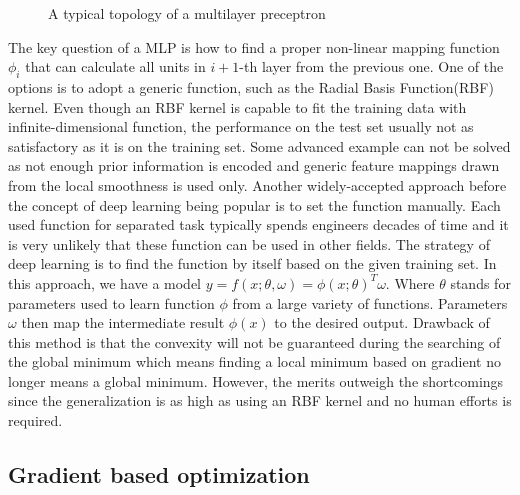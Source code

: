 \begin{figure}[!ht]
    \centering
    \caption{A typical topology of a multilayer preceptron}
    \label{lr_fig:ml_mlp_intro}
\end{figure}
%
The key question of a MLP is how to find a proper non-linear mapping function $\phi_i$ that can calculate all units in $i+1$-th layer from the previous one.
One of the options is to adopt a generic function, such as the Radial Basis Function(RBF)\citep{chang2010} kernel.
Even though an RBF kernel is capable to fit the training data with infinite-dimensional function, the performance on the test set usually not as satisfactory as it is on the training set.
Some advanced example can not be solved as not enough prior information is encoded and generic feature mappings drawn from the local smoothness is used only.
Another widely-accepted approach before the concept of deep learning being popular is to set the function manually.
Each used function for separated task typically spends engineers decades of time and it is very unlikely that these function can be used in other fields.
The strategy of deep learning is to find the function by itself based on the given training set.
In this approach, we have a model $y=f(x;\theta,\omega)=\phi(x;\theta)^T\omega$.
Where $\theta$ stands for parameters used to learn function $\phi$ from a large variety of functions.
Parameters $\omega$ then map the intermediate result $\phi(x)$ to the desired output.
Drawback of this method is that the convexity will not be guaranteed during the searching of the global minimum which means finding a local minimum based on gradient no longer means a global minimum.
However, the merits outweigh the shortcomings since the generalization is as high as using an RBF kernel and no human efforts is required.

\subsection{Gradient based optimization}
